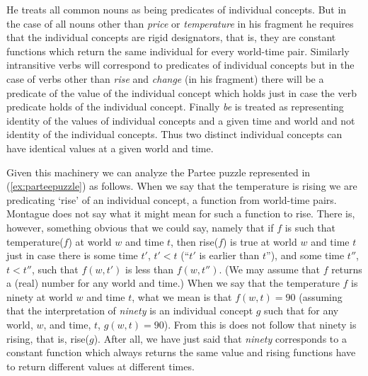 He treats all common nouns as being predicates of individual
concepts.  But in the case of all nouns other than \textit{price} or
\textit{temperature} in his fragment he requires that the individual
concepts are rigid designators, that is, they are constant functions
which return the same individual for every world-time pair.  Similarly
intransitive verbs will correspond to predicates of individual
concepts but in the case of verbs other than \textit{rise} and
\textit{change} (in his fragment) there will be a predicate of the
value of the individual concept which holds just in case the verb
predicate holds of the individual concept.  Finally \textit{be} is
treated as representing identity of the values of individual concepts
and a given time and world
and not identity of the individual concepts.  Thus two distinct
individual concepts can have identical values at a given world and
time.

Given this machinery we can analyze the Partee puzzle represented in
(\ref{ex:parteepuzzle}) as follows.  When we say that the temperature
is rising we are predicating `rise' of an individual concept, a
function from world-time pairs.  Montague does not say what it might
mean for such a function to rise.  There is, however,  something
obvious that we could say, namely that if $f$ is such that
temperature($f$) at world $w$ and time $t$, then rise($f$) is true at world $w$ and time $t$ just
in case there is some time $t'$, $t'< t$ (``$t'$ is earlier than $t$''), and some time $t''$,
$t<t''$, such that $f(w,t')$ is less than $f(w,t'')$.  (We may assume
that $f$ returns  a (real) number for any world and time.) When we say
that the temperature $f$ is ninety at world $w$ and time $t$, what we
mean is that $f(w,t)=90$ (assuming that the interpretation of
\textit{ninety} is an individual concept $g$ such that for any world,
$w$, and time, $t$, $g(w,t)=90$).  From this is does not follow that
ninety is rising, that is, rise($g$).  After all, we have just said
that \textit{ninety} corresponds to a constant function which always
returns the same value and rising functions have to return different
values at different times.

